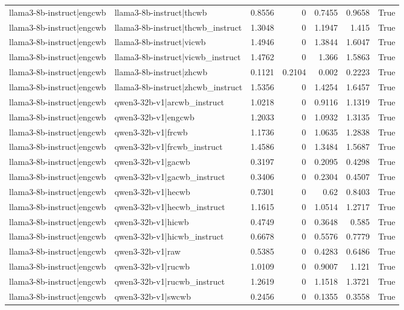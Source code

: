 \begin{table}
\begin{tabular}{l l r r r r l}
llama3-8b-instruct|engcwb & llama3-8b-instruct|thcwb & 0.8556 & 0 & 0.7455 & 0.9658 & True \\
llama3-8b-instruct|engcwb & llama3-8b-instruct|thcwb_instruct & 1.3048 & 0 & 1.1947 & 1.415 & True \\
llama3-8b-instruct|engcwb & llama3-8b-instruct|vicwb & 1.4946 & 0 & 1.3844 & 1.6047 & True \\
llama3-8b-instruct|engcwb & llama3-8b-instruct|vicwb_instruct & 1.4762 & 0 & 1.366 & 1.5863 & True \\
llama3-8b-instruct|engcwb & llama3-8b-instruct|zhcwb & 0.1121 & 0.2104 & 0.002 & 0.2223 & True \\
llama3-8b-instruct|engcwb & llama3-8b-instruct|zhcwb_instruct & 1.5356 & 0 & 1.4254 & 1.6457 & True \\
llama3-8b-instruct|engcwb & qwen3-32b-v1|arcwb_instruct & 1.0218 & 0 & 0.9116 & 1.1319 & True \\
llama3-8b-instruct|engcwb & qwen3-32b-v1|engcwb & 1.2033 & 0 & 1.0932 & 1.3135 & True \\
llama3-8b-instruct|engcwb & qwen3-32b-v1|frcwb & 1.1736 & 0 & 1.0635 & 1.2838 & True \\
llama3-8b-instruct|engcwb & qwen3-32b-v1|frcwb_instruct & 1.4586 & 0 & 1.3484 & 1.5687 & True \\
llama3-8b-instruct|engcwb & qwen3-32b-v1|gacwb & 0.3197 & 0 & 0.2095 & 0.4298 & True \\
llama3-8b-instruct|engcwb & qwen3-32b-v1|gacwb_instruct & 0.3406 & 0 & 0.2304 & 0.4507 & True \\
llama3-8b-instruct|engcwb & qwen3-32b-v1|hecwb & 0.7301 & 0 & 0.62 & 0.8403 & True \\
llama3-8b-instruct|engcwb & qwen3-32b-v1|hecwb_instruct & 1.1615 & 0 & 1.0514 & 1.2717 & True \\
llama3-8b-instruct|engcwb & qwen3-32b-v1|hicwb & 0.4749 & 0 & 0.3648 & 0.585 & True \\
llama3-8b-instruct|engcwb & qwen3-32b-v1|hicwb_instruct & 0.6678 & 0 & 0.5576 & 0.7779 & True \\
llama3-8b-instruct|engcwb & qwen3-32b-v1|raw & 0.5385 & 0 & 0.4283 & 0.6486 & True \\
llama3-8b-instruct|engcwb & qwen3-32b-v1|rucwb & 1.0109 & 0 & 0.9007 & 1.121 & True \\
llama3-8b-instruct|engcwb & qwen3-32b-v1|rucwb_instruct & 1.2619 & 0 & 1.1518 & 1.3721 & True \\
llama3-8b-instruct|engcwb & qwen3-32b-v1|swcwb & 0.2456 & 0 & 0.1355 & 0.3558 & True \\

\end{tabular}
\end{table}
